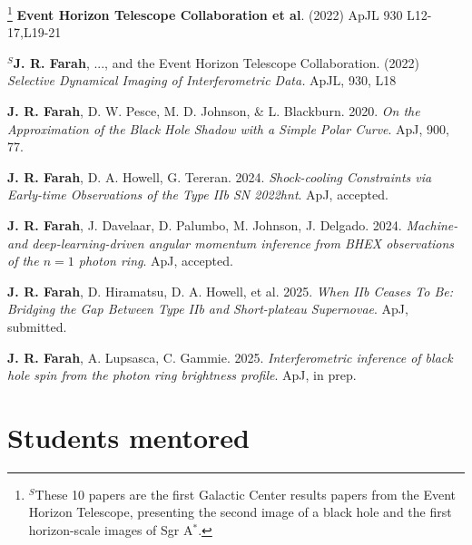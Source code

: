 \documentclass[margin,line]{res}
\begin{document}
\begin{resume}
\footnote[$^S$]{\noindent $^S$These 10  papers are the first Galactic Center results papers from the Event Horizon Telescope, presenting the second image of a black hole and the first horizon-scale images of Sgr A$^\ast$.}
\textbf{Event Horizon Telescope Collaboration et al}. (2022) ApJL 930 L12-17,L19-21

\textbf{$^S$J. R. Farah}, ..., and the Event Horizon Telescope Collaboration. (2022) \textit{Selective Dynamical Imaging of Interferometric Data.} ApJL, 930, L18


\textbf{J. R. Farah}, D. W. Pesce, M. D. Johnson, \& L. Blackburn. 2020. \textit{On the Approximation of the Black Hole Shadow with a Simple Polar Curve}. ApJ, 900, 77.

\textbf{J. R. Farah}, D. A. Howell, G. Tereran. 2024. \textit{Shock-cooling Constraints via Early-time Observations of the Type IIb SN 2022hnt}. ApJ, accepted.


\textbf{J. R. Farah}, J. Davelaar, D. Palumbo, M. Johnson, J. Delgado. 2024. \textit{Machine- and deep-learning-driven angular momentum inference from BHEX observations of the $n = 1$ photon ring}. ApJ, accepted.

\textbf{J. R. Farah}, D. Hiramatsu, D. A. Howell, et al. 2025. \textit{When IIb Ceases To Be: Bridging the Gap Between Type IIb and Short-plateau Supernovae}. ApJ, submitted.


\textbf{J. R. Farah}, A. Lupsasca, C. Gammie. 2025. \textit{Interferometric inference of black hole spin from the photon ring brightness profile}. ApJ, in prep.






\vspace{+.4cm}
\section{\sc Students mentored}


\end{resume}
\end{document}
